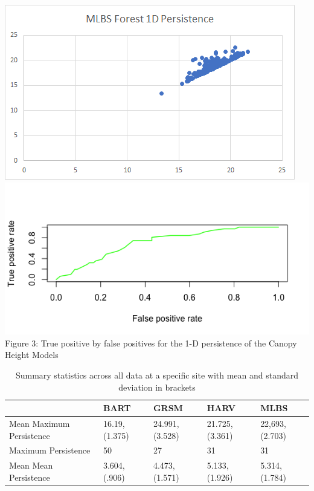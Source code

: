 \documentclass[10pt]{article}
\begin{document}
\includegraphics[scale= 0.5]{mlbs_1d}\\
\includegraphics[scale= 0.5]{1d_roc}\\
Figure 3: True positive by false positives for the 1-D persistence of the Canopy Height Models

\begin{table}[]
\centering
\caption{Summary statistics across all data at a specific site with mean and standard deviation in brackets}
\begin{tabular}{|l|l|l|l|l|}
\hline
                         & BART          & GRSM           & HARV          & MLBS          \\ \hline
Mean Maximum Persistence & 16.19,(1.375) & 24.991,(3.528)  & 21.725,(3.361) & 22,693,(2.703) \\ \hline
Maximum Persistence      & 50            & 27             & 31            & 31            \\ \hline
Mean Mean Persistence    & 3.604,(.906) & 4.473,(1.571) & 5.133,(1.926) & 5.314,(1.784) \\ \hline
\end{tabular}
\end{table}
\end{document}
